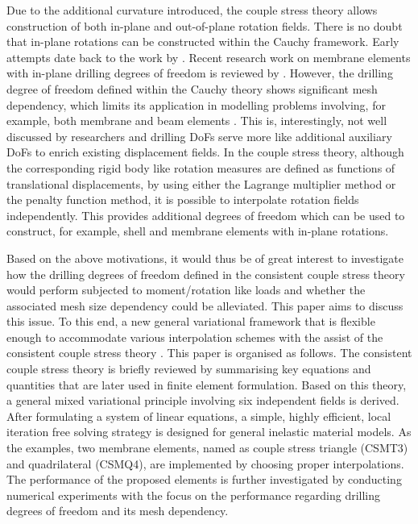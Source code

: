 \documentclass[3p,sort&compress,11pt,fleqn,review]{elsarticle}
\newcommand*{\alert}[1]{#1}
\begin{document}
Due to the additional curvature introduced, the couple stress theory allows construction of both in-plane and out-of-plane rotation fields. There is no doubt that in-plane rotations can be constructed within the Cauchy framework. Early attempts date back to the work by \citet{Allman1984}. Recent research work on membrane elements with in-plane drilling degrees of freedom is reviewed by \citet{Boutagouga2020}. However, the drilling degree of freedom defined within the Cauchy theory shows significant mesh dependency, which limits its application in modelling problems involving, for example, both membrane and beam elements \citep{Chang2020}. This is, interestingly, not well discussed by researchers and drilling DoFs serve more like additional auxiliary DoFs to enrich existing displacement fields. In the couple stress theory, although the corresponding rigid body like rotation measures are defined as functions of translational displacements, by using either the Lagrange multiplier method or the penalty function method, it is possible to interpolate rotation fields independently. This provides additional degrees of freedom which can be used to construct, for example, shell and membrane elements with in-plane rotations.

\alert{Based on the above motivations, it would thus be of great interest to investigate how the drilling degrees of freedom defined in the consistent couple stress theory would perform subjected to moment/rotation like loads and whether the associated mesh size dependency could be alleviated. This paper aims to discuss this issue. To this end, a new general variational framework that is flexible enough to accommodate various interpolation schemes with the assist of the consistent couple stress theory \citep{Hadjesfandiari2011}.} This paper is organised as follows. The consistent couple stress theory is briefly reviewed by summarising key equations and quantities that are later used in finite element formulation. Based on this theory, a general mixed variational principle involving six independent fields is derived. After formulating a system of linear equations, a simple, highly efficient, local iteration free solving strategy is designed for general inelastic material models. As the examples, two membrane elements, named as couple stress triangle (CSMT3) and quadrilateral (CSMQ4), are implemented by choosing proper interpolations. The performance of the proposed elements is further investigated by conducting numerical experiments with the focus on the performance regarding drilling degrees of freedom and its mesh dependency.
\end{document}
